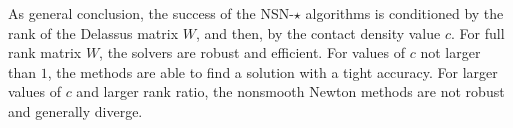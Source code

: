 As general conclusion, the success of the {\sf NSN-$\star$} algorithms is conditioned by  the rank of the Delassus matrix $W$, and then, by the contact density value $c$. For full rank matrix $W$, the solvers are robust and efficient. For values of $c$ not larger than $1$, the methods are able to find a solution with a tight accuracy. For larger values of $c$ and larger rank ratio, the nonsmooth Newton methods are not robust and generally diverge.

\begin{figure}
  \centering
    \subfiglayout
 \\

\end{figure}
